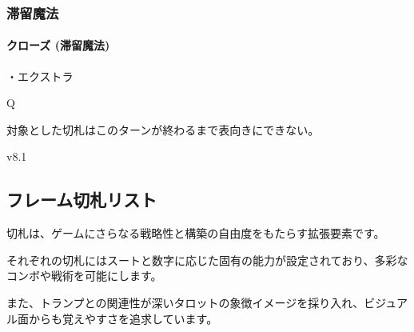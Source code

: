 \documentclass[letterpaper,10pt,dvipdfmx]{sphinxmanual}
\begin{document}
\subsubsection{滞留魔法}
\label{\detokenize{auto/frameActionlist:id105}}

\paragraph{クローズ (滞留魔法)}
\label{\detokenize{auto/frameActionlist:fog-closefog}}\label{\detokenize{auto/frameActionlist:id106}}
\sphinxAtStartPar
{}

\sphinxAtStartPar
・エクストラ

\sphinxAtStartPar
{} Q

\sphinxAtStartPar
{}

\sphinxAtStartPar
対象とした切札はこのターンが終わるまで表向きにできない。

\sphinxAtStartPar
{}  v8.1


\subsection{フレーム切札リスト}
\label{\detokenize{auto/frameActionlist:trumplist-act-frame}}\label{\detokenize{auto/frameActionlist:id107}}
\sphinxAtStartPar
切札は、ゲームにさらなる戦略性と構築の自由度をもたらす拡張要素です。

\sphinxAtStartPar
それぞれの切札にはスートと数字に応じた固有の能力が設定されており、多彩なコンボや戦術を可能にします。

\sphinxAtStartPar
また、トランプとの関連性が深いタロットの象徴イメージを採り入れ、ビジュアル面からも覚えやすさを追求しています。
\end{document}

